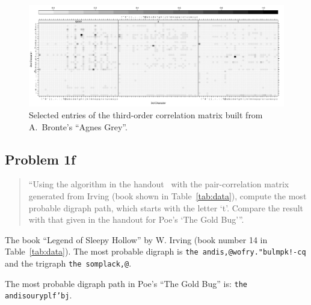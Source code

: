 \documentclass[conference]{IEEEtran}
\newcommand{\codeinline}[1]{{\fontsize{8}{0}\selectfont\texttt{#1}}}
\newcommand{\codefile}[1]{
  \begin{framed}
  \fontsize{5.65}{6.78}\selectfont
  
  \end{framed}
}
\begin{document}
\begin{figure}[!t]
\centering
\includegraphics[width=\textwidth]{agnes_grey_3rd_order}
\caption{Selected entries of the third-order correlation matrix built from 
A.~Bronte's ``Agnes Grey''.}
\label{fig:agnes_grey_3rd_order}
\end{figure}


\subsection{Problem 1f}
\label{sec:problem1f}

\begin{quote}
``Using the algorithm in the handout~\cite{Bennett1976} with the pair-correlation matrix 
generated from Irving (book shown in Table~\ref{tab:data}), compute the most 
probable digraph path, which starts with the letter `t'. Compare the result with 
that given in the handout for Poe's `The Gold Bug'''.
\end{quote}

\codefile{problem1f.py}

The book ``Legend of Sleepy Hollow'' by W. Irving (book number 14 in Table~\ref{tab:data}).
The most probable digraph is \codeinline{the andis,@wofry."bulmpk!-cq} and the 
trigraph \codeinline{the somplack,@}.

The most probable digraph path in Poe's ``The Gold Bug'' is: \codeinline{the andisouryplf'bj}.
\end{document}
